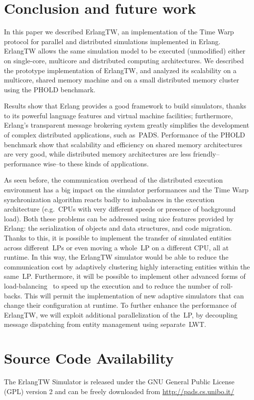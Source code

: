 \documentclass{sigplanconf}
\begin{document}
\section{Conclusion and future work}\label{sec:conclusions}

In this paper we described ErlangTW, an implementation of the Time
Warp protocol for parallel and distributed simulations implemented in
Erlang. ErlangTW allows the same simulation model to be executed
(unmodified) either on single-core, multicore and distributed
computing architectures. We described the prototype implementation of
ErlangTW, and analyzed its scalability on a multicore, shared memory
machine and on a small distributed memory cluster using the PHOLD
benchmark.

Results show that Erlang provides a good framework to build
simulators, thanks to its powerful language features and virtual
machine facilities; furthermore, Erlang's transparent message
brokering system greatly simplifies the development of complex
distributed applications, such as~\ac{PADS}. Performance of the PHOLD
benchmark show that scalability and efficiency on shared memory
architectures are very good, while distributed memory architectures
are less friendly--performance wise--to these kinds of applications.

As seen before, the communication overhead of the distributed
execution environment has a big impact on the simulator performances
and the Time Warp synchronization algorithm reacts badly to imbalances
in the execution architecture (e.g.~CPUs with very different speeds or
presence of background load). Both these problems can be addressed
using nice features provided by Erlang: the serialization of objects
and data structures, and code migration. Thanks to this, it is
possible to implement the transfer of simulated entities across
different~\acp{LP} or even moving a whole~\ac{LP} on a different CPU,
all at runtime. In this way, the ErlangTW simulator would be able to
reduce the communication cost by adaptively clustering highly
interacting entities within the same~\ac{LP}. Furthermore, it will be
possible to implement other advanced forms of
load-balancing~\cite{gda-ijspm-2009} to speed up the execution and to
reduce the number of roll-backs. This will permit the implementation
of new adaptive simulators that can change their configuration at
runtime. To further enhance the performance of ErlangTW, we will
exploit additional parallelization of the~\ac{LP}, by decoupling
message dispatching from entity management using separate~LWT.


\section*{Source Code Availability}\label{sec:source}
The ErlangTW Simulator is released under the GNU General Public License (GPL) 
version 2 and can be freely downloaded from
\url{http://pads.cs.unibo.it/}



\end{document}
